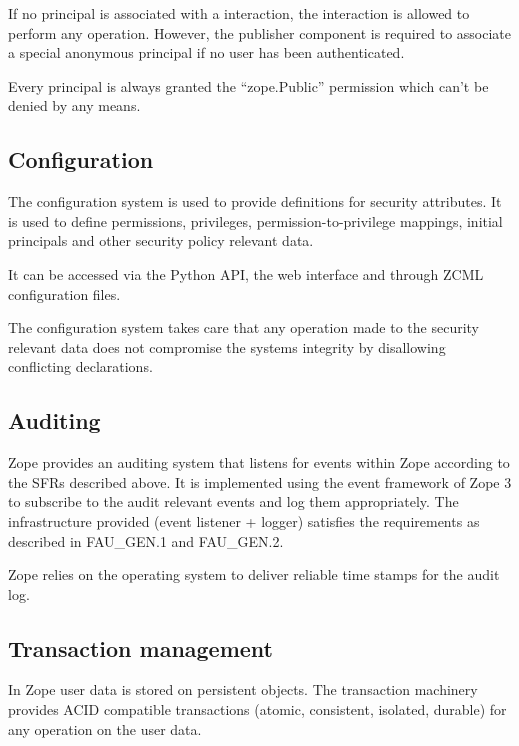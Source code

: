\documentclass[12pt,english]{scrbook}
\begin{document}
If no principal is associated with a interaction, the interaction is allowed to
perform any operation. However, the publisher component is required to
associate a special anonymous principal if no user has been authenticated.

Every principal is always granted the ``zope.Public'' permission which can't be
denied by any means.



\subsection{Configuration}

The configuration system is used to provide definitions for security
attributes. It is used to define permissions, privileges,
permission-to-privilege mappings, initial principals and other security policy
relevant data.

It can be accessed via the Python API, the web interface and
through ZCML configuration files.

The configuration system takes care that any operation made to the security
relevant data does not compromise the systems integrity by disallowing
conflicting declarations.

\subsection{Auditing}

Zope provides an auditing system that listens for events within Zope according
to the SFRs described above. It is implemented using the event framework of
Zope 3 to subscribe to the audit relevant events and log them appropriately.
The infrastructure provided (event listener + logger) satisfies the
requirements as described in FAU{\_}GEN.1 and FAU{\_}GEN.2.

Zope relies on the operating system to deliver reliable time stamps for the
audit log.





\subsection{Transaction management}

In Zope user data is stored on persistent objects. The transaction machinery
provides ACID compatible transactions (atomic, consistent, isolated, durable)
for any operation on the user data.
\end{document}
